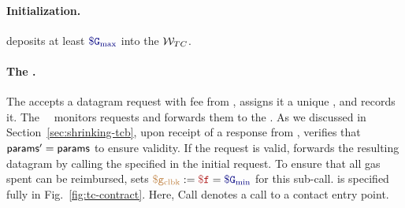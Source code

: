 \paragraph{Initialization.}
\tc deposits at least $\constgasmax$ into the $\tcadd$.

\paragraph{The \tcontract \tcont.}
The \tcontract accepts a datagram request with fee \fee from \reqcont, assigns it a unique \dgid, and records it.
The \tcs\ \medname\ \relay monitors requests and forwards them to the \encname.
As we discussed in Section~\ref{sec:shrinking-tcb}, upon receipt of a response from \tcadd, \tcont verifies that ${\sf params}' = {\sf params}$ to ensure validity.
If the request is valid, \tcont forwards the resulting datagram \dgm by calling the \dgcallback specified in the initial request.
To ensure that all gas spent can be reimbursed, \tcont sets $\gascallback := \fee = \constgasmin$ for this sub-call.
\tcont is specified fully in Fig.~\ref{fig:tc-contract}. Here, Call denotes a call to a contact entry point. 

